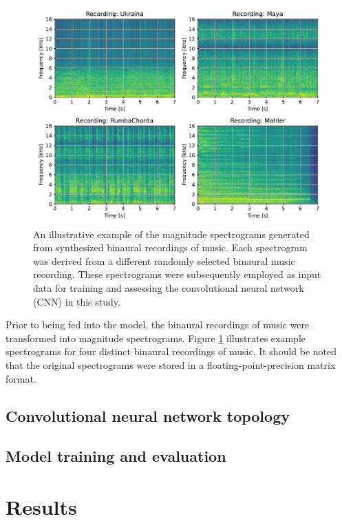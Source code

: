\documentclass{article}
\begin{document}
\begin{figure}
  \centering
  \includegraphics[width=\linewidth]{../figures/samples.pdf}
  \caption{\label{fig:samples}An illustrative example of the magnitude spectrograms generated from synthesized binaural recordings of music. Each spectrogram was derived from a different randomly selected binaural music recording. These spectrograms were subsequently employed as input data for training and assessing the convolutional neural network (CNN) in this study. }
\end{figure}

Prior to being fed into the model, the binaural recordings of music were transformed into magnitude spectrograms. Figure \ref{fig:samples} illustrates example spectrograms for four distinct binaural recordings of music. It should be noted that the original spectrograms were stored in a floating-point-precision matrix format.

\subsection{Convolutional neural network topology}
\subsection{Model training and evaluation}

\section{Results}
\label{sec:results}
\end{document}

